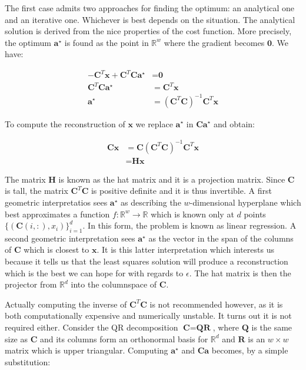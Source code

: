 \documentclass[12pt,a4paper,oneside,english]{UPBThesis}
\newcommand{\hctimes}[2]{{#1}\!\times\!{#2}}
\newcommand{\hcsignalspace}{\mathbb{R}^d}
\newcommand{\hcweightspace}{\mathbb{R}^w}
\begin{document}
The first case admits two approaches for finding the optimum: an analytical one and an iterative one. Whichever is best depends on the situation. The analytical solution is derived from the nice properties of the cost function. More precisely, the optimum $\textbf{a}^\star$ is found as the point in $\hcweightspace$ where the gradient becomes $\textbf{0}$. We have:

\begin{align*}
- \textbf{C}^T \textbf{x} + \textbf{C}^T\textbf{C}\textbf{a}^\star & = \textbf{0} \\
\textbf{C}^T\textbf{C}\textbf{a}^\star & = \textbf{C}^T\textbf{x} \\
\textbf{a}^\star & = {\left( \textbf{C}^T\textbf{C} \right)}^{-1} \textbf{C}^T\textbf{x}
\end{align*}

To compute the reconstruction of $\textbf{x}$ we replace $\textbf{a}^\star$ in $\textbf{C}\textbf{a}^\star$ and obtain:

\begin{align*}
\textbf{C}\textbf{x} & = \textbf{C}{\left( \textbf{C}^T\textbf{C} \right)}^{-1} \textbf{C}^T\textbf{x} \\
& = \textbf{H}\textbf{x}
\end{align*}

The matrix $\textbf{H}$ is known as the hat matrix and it is a projection matrix. Since $\textbf{C}$ is tall, the matrix $\textbf{C}^T\textbf{C}$ is positive definite and it is thus invertible. A first geometric interpretatios sees $\textbf{a}^\star$ as describing the $w$-dimensional hyperplane which best approximates a function $f:\hcweightspace \rightarrow \mathbb{R}$ which is known only at $d$ points $\{(\textbf{C}(i,:),x_i)\}_{i=1}^d$. In this form, the problem is known as linear regression. A second geometric interpretation sees $\textbf{a}^\star$ as the vector in the span of the columns of $\textbf{C}$ which is closest to $\textbf{x}$. It is this latter interpretation which interests us because it tells us that the least squares solution will produce a reconstruction which is the best we can hope for with regards to $\epsilon$. The hat matrix is then the projector from $\hcsignalspace$ into the columnspace of $\textbf{C}$.

Actually computing the inverse of $\textbf{C}^T\textbf{C}$ is not recommended however, as it is both computationally expensive and numerically unstable. It turns out it is not required either. Consider the QR decomposition $\textbf{C} = \textbf{Q}\textbf{R}$, where $\textbf{Q}$ is the same size as $\textbf{C}$ and its columns form an orthonormal basis for $\hcsignalspace$ and $\textbf{R}$ is an $\hctimes{w}{w}$ matrix which is upper triangular. Computing $\textbf{a}^\star$ and $\textbf{C}\textbf{a}$ becomes, by a simple substitution:
\end{document}
